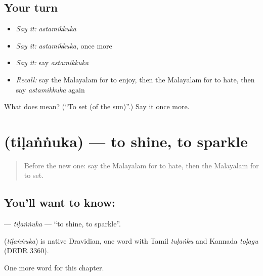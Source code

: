 \subsection*{Your turn}
\begin{itemize}
\raggedright
  \item \emph{Say it:} \emph{astamikkuka}
  \item \emph{Say it:} \emph{astamikkuka}, once more
  \item \emph{Say it:} say \emph{astamikkuka}
  \item \emph{Recall:} say the Malayalam for to enjoy, then the Malayalam for to hate, then say \emph{astamikkuka} again
\end{itemize}

\begin{tcolorbox}[breakable,colback=teal!4,colframe=teal!35!black,title={Before you move on}]
What does  mean? (\textquotedblleft{}To set (of the sun)\textquotedblright{}.) Say it once more.
\end{tcolorbox}
\section[\texorpdfstring{\ml{തിളങ്ങുക} (tiḷaṅṅuka)}{തിളങ്ങുക (tiḷaṅṅuka)}]{ (tiḷaṅṅuka) — to shine, to sparkle}

\label{lesson:ML-C229-tilannuka}



\begin{quote}
Before the new one: say the Malayalam for to hate, then the Malayalam for to set.
\end{quote}

\subsection*{You'll want to know: }
\textbf{} — \emph{tiḷaṅṅuka} — \textquotedblleft{}to shine, to sparkle\textquotedblright{}.

\begin{cousinweb}
\textbf{} (\emph{tiḷaṅṅuka}) is native Dravidian, one word with Tamil \emph{tuḷaṅku} and Kannada \emph{toḷagu} (DEDR 3360).
\end{cousinweb}

\begin{grammarlens}[title={What you've built}]
One more word for this chapter.
\end{grammarlens}

